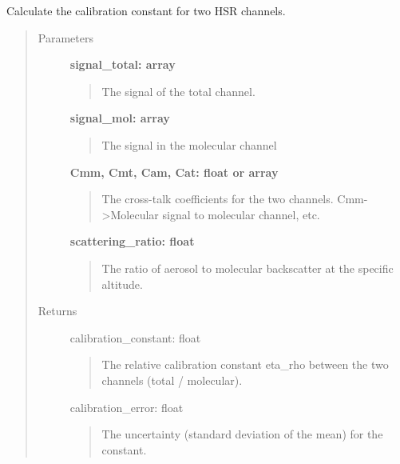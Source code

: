 \documentclass[letterpaper,10pt,english]{sphinxmanual}
\begin{document}
\begin{fulllineitems}
\label{hsrl_retrieval:hsrl_retrieval.hsr_calibration_constant}
Calculate the calibration constant for two HSR channels.
\begin{quote}\begin{description}
\item[{Parameters}] \leavevmode
\textbf{signal\_total: array}
\begin{quote}

The signal of the total channel.
\end{quote}

\textbf{signal\_mol: array}
\begin{quote}

The signal in the molecular channel
\end{quote}

\textbf{Cmm, Cmt, Cam, Cat: float or array}
\begin{quote}

The cross-talk coefficients for the two channels. Cmm-\textgreater{}Molecular signal to molecular channel, etc.
\end{quote}

\textbf{scattering\_ratio: float}
\begin{quote}

The ratio of aerosol to molecular backscatter at the specific altitude.
\end{quote}

\item[{Returns}] \leavevmode
calibration\_constant: float
\begin{quote}

The relative calibration constant eta\_rho between the two channels (total / molecular).
\end{quote}

calibration\_error: float
\begin{quote}

The uncertainty (standard deviation of the mean) for the constant.
\end{quote}

\end{description}\end{quote}

\end{fulllineitems}
\end{document}

